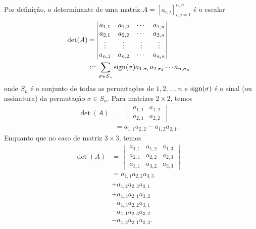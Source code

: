 Por definição, o determinante de uma matriz $A = [a_{i,j}]_{i,j=1}^{n,n}$ é o escalar
\begin{subequations}
  \begin{align}
    \det(A) &=
              \begin{vmatrix}
                a_{1,1} & a_{1,2} & \cdots & a_{1,n}\\
                a_{2,1} & a_{2,2} & \cdots & a_{2,n}\\
                \vdots & \vdots & \vdots & \vdots\\
                a_{n,1} & a_{n,2} & \cdots & a_{n,n}                
              \end{vmatrix}\\
            &:= \sum_{\sigma\in S_n}\operatorname{sign}(\sigma)a_{1,\sigma_1}a_{2,\sigma_2}\cdots a_{n,\sigma_n}
  \end{align}
\end{subequations}
onde $S_n$ é o conjunto de todas as permutações de ${1, 2, \dotsc, n}$ e $\operatorname{sign}(\sigma)$ é o sinal (ou assinatura) da permutação $\sigma\in S_n$. Para matrizes $2\times 2$, temos
\begin{subequations}
  \begin{align}
    \det(A) &=
        \begin{vmatrix}
          a_{1,1} & a_{1,2}\\
          a_{2,1} & a_{2,2}
        \end{vmatrix}\\
      &= a_{1,1}a_{2,2} - a_{1,2}a_{2,1}.
  \end{align}
\end{subequations}
Enquanto que no caso de matriz $3\times 3$, temos
\begin{subequations}
  \begin{align}
    \det(A) &=
              \begin{vmatrix}
                a_{1,1} & a_{1,2} & a_{1,3}\\
                a_{2,1} & a_{2,2} & a_{2,3}\\
                a_{3,1} & a_{3,2} & a_{3,3}
              \end{vmatrix}\\
            &= a_{1,1}a_{2,2}a_{3,3}\\
            &+ a_{1,2}a_{2,3}a_{3,1}\\
            &+ a_{1,3}a_{2,1}a_{3,2}\\
            &- a_{1,3}a_{2,2}a_{3,1}\\
            &- a_{1,1}a_{2,3}a_{3,2}\\
            &- a_{1,2}a_{2,1}a_{3,3}.
  \end{align}
\end{subequations}

